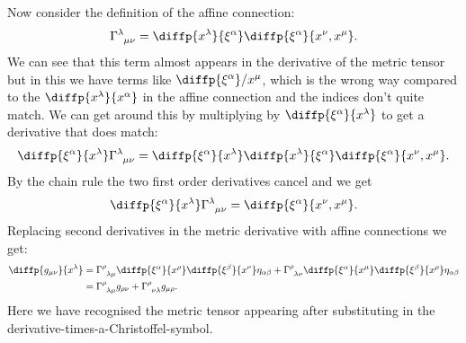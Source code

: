 \documentclass[fleqn]{NotesClass}
\newcommand*{\christoffel}[3]{\tensor{\Gamma}{^{#1}_{{#2}{#3}}}}
\begin{document}
    Now consider the definition of the affine connection:
    \begin{equation}
        \christoffel{\lambda}{\mu}{\nu} = \diffp{x^\lambda}{\xi^\alpha} \diffp{\xi^\alpha}{x^\nu, x^\mu}.
    \end{equation}
    We can see that this term almost appears in the derivative of the metric tensor but in this we have terms like \(\diffp{\xi^\alpha}/{x^\mu}\), which is the wrong way compared to the \(\diffp{x^\lambda}{x^\alpha}\) in the affine connection and the indices don't quite match.
    We can get around this by multiplying by \(\diffp{\xi^\alpha}{x^\lambda}\) to get a derivative that does match:
    \begin{equation}
        \diffp{\xi^\alpha}{x^\lambda} \christoffel{\lambda}{\mu}{\nu} = \diffp{\xi^\alpha}{x^\lambda} \diffp{x^\lambda}{\xi^\alpha} \diffp{\xi^\alpha}{x^\nu, x^\mu}.
    \end{equation}
    By the chain rule the two first order derivatives cancel and we get
    \begin{equation}
        \diffp{\xi^\alpha}{x^\lambda}\christoffel{\lambda}{\mu}{\nu} = \diffp{\xi^\alpha}{x^\nu, x^\mu}.
    \end{equation}
    Replacing second derivatives in the metric derivative with affine connections we get:
    \begin{align}
        \diffp{g_{\mu\nu}}{x^\lambda} &= \christoffel{\rho}{\lambda}{\mu} \diffp{\xi^\alpha}{x^\rho} \diffp{\xi^\beta}{x^\nu} \eta_{\alpha\beta} + \christoffel{\rho}{\lambda}{\nu} \diffp{\xi^\alpha}{x^\mu} \diffp{\xi^\beta}{x^\rho} \eta_{\alpha\beta}\\
        &= \christoffel{\rho}{\lambda}{\mu} g_{\rho\nu} + \christoffel{\rho}{\nu}{\lambda} g_{\mu\rho}.\label{eqn:christoffel in terms of metric 1}
    \end{align}
    Here we have recognised the metric tensor appearing after substituting in the derivative-times-a-Christoffel-symbol.
    
\end{document}
